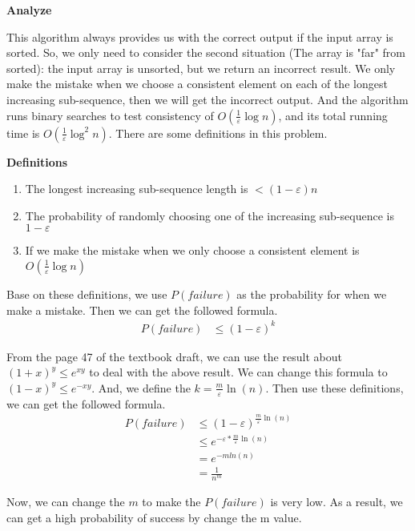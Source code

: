 
\begin{homeworkProblem}

\textbf{Analyze}

This algorithm always provides us with the correct output if the input array is sorted. So, we only need to consider the second situation (The array is "far" from sorted): the input array is unsorted, but we return an incorrect result. We only make the mistake when we choose a consistent element on each of the longest increasing sub-sequence, then we will get the incorrect output. And the algorithm runs binary searches to test consistency of $O(\frac{1}{\varepsilon}\log n)$, and its total running time is $O(\frac{1}{\varepsilon}\log^2n)$.  There are some definitions in this problem. 

\textbf{Definitions}

\begin{enumerate}
    \item The longest increasing sub-sequence length is $< (1-\varepsilon)n$
    \item The probability of randomly choosing one of the increasing sub-sequence is $ 1 - \varepsilon$
    \item If we make the mistake when we only choose a consistent element is $O(\frac{1}{\varepsilon}\log n)$
\end{enumerate}
Base on these definitions,  we use $P(failure)$ as the probability for when we make a mistake. Then we can get the followed formula.
\[
    \begin{split}
        P(failure) &\leq (1-\varepsilon)^{k}
    \end{split}
\]

From the page 47 of the textbook draft, we can use the result about $(1 + x)^y \leq e^{xy} $ to deal with the above result. We can change this formula to $(1 - x)^y \leq e^{-xy}$. And, we define the $k = \frac{m}{\varepsilon}\ln (n)$. Then use these definitions, we can get the followed formula.
\[
    \begin{split}
        P(failure) &\leq (1-\varepsilon)^{\frac{m}{\varepsilon}\ln (n)}
        \\
        &\leq e^{-\varepsilon * \frac{m}{\varepsilon}\ln (n)}
        \\
        &= e^{-m ln (n)} \\
        &= \frac{1}{n^m}
    \end{split}
\]

Now, we can change the $m$ to make the $ P(failure)$ is very low. As a result, we can get a high probability of success by change the m value.
\end{homeworkProblem}


